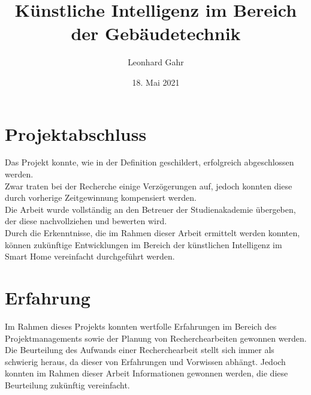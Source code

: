\documentclass[
	ngerman,
	12pt, %
]{pm}
\title{Künstliche Intelligenz im Bereich der Gebäudetechnik}
\author{Leonhard Gahr} %
\date{18. Mai 2021} %
\institute{\texttt{[image: ../img/sie-logo.png]}\hfill\texttt{[image: ../img/dhbw-logo]}} %
\begin{document}
\maketitle %


\section*{\large Projektabschluss}
Das Projekt konnte, wie in der Definition geschildert, erfolgreich abgeschlossen werden.\\
Zwar traten bei der Recherche einige Verzögerungen auf, jedoch konnten diese durch vorherige Zeitgewinnung kompensiert werden.\\
Die Arbeit wurde vollständig an den Betreuer der Studienakademie übergeben, der diese nachvollziehen und bewerten wird.\\
Durch die Erkenntnisse, die im Rahmen dieser Arbeit ermittelt werden konnten, können zukünftige Entwicklungen im Bereich der künstlichen Intelligenz im Smart Home vereinfacht durchgeführt werden.

\section*{\large Erfahrung}
Im Rahmen dieses Projekts konnten wertfolle Erfahrungen im Bereich des Projektmanagements sowie der Planung von Recherchearbeiten gewonnen werden. Die Beurteilung des Aufwands einer Recherchearbeit stellt sich immer als schwierig heraus, da dieser von Erfahrungen und Vorwissen abhängt. Jedoch konnten im Rahmen dieser Arbeit Informationen gewonnen werden, die diese Beurteilung zukünftig vereinfacht.
\end{document}
